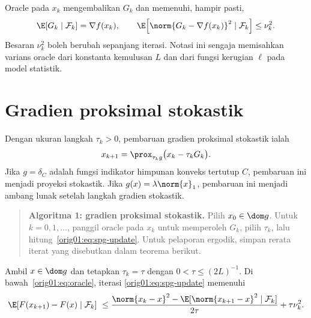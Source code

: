 Oracle pada $x_k$ mengembalikan $G_k$ dan memenuhi, hampir pasti,
\begin{equation}
  \label{orig01:eq:oracle}
  \E[G_k\mid\mathcal F_k]=\nabla f(x_k),
  \qquad
  \E\!\left[\norm{G_k-\nabla f(x_k)}^2\mid\mathcal F_k\right]
  \leq \nu_k^2.
\end{equation}
Besaran $\nu_k^2$ boleh berubah sepanjang iterasi. Notasi ini sengaja
memisahkan varians oracle dari konstanta kemulusan $L$ dan dari fungsi
kerugian $\ell$ pada model statistik.

\section{Gradien proksimal stokastik}
\label{orig01:section:spg}

Dengan ukuran langkah $\tau_k>0$, pembaruan gradien proksimal stokastik ialah
\begin{equation}
  \label{orig01:eq:spg-update}
  x_{k+1}
  =\prox_{\tau_k g}\bigl(x_k-\tau_kG_k\bigr).
\end{equation}
Jika $g=\delta_C$ adalah fungsi indikator himpunan konveks tertutup $C$,
pembaruan ini menjadi proyeksi stokastik. Jika $g(x)=\lambda\norm{x}_1$,
pembaruan ini menjadi ambang lunak setelah langkah gradien stokastik.

\begin{quote}
\textbf{Algoritma 1: gradien proksimal stokastik.}
Pilih $x_0\in\dom g$. Untuk $k=0,1,\dots$, panggil oracle pada $x_k$ untuk
memperoleh $G_k$, pilih $\tau_k$, lalu hitung~\eqref{orig01:eq:spg-update}.
Untuk pelaporan ergodik, simpan rerata iterat yang disebutkan dalam teorema
berikut.
\end{quote}

\begin{lemma}
  \label{orig01:lemma:spg-one-step}
  Ambil $x\in\dom g$ dan tetapkan $\tau_k=\tau$ dengan
  $0<\tau\leq(2L)^{-1}$. Di bawah~\eqref{orig01:eq:oracle}, iterasi
  \eqref{orig01:eq:spg-update} memenuhi
  \begin{multline}
    \label{orig01:eq:spg-one-step}
    \E[F(x_{k+1})-F(x)\mid\mathcal F_k]\
    \leq
    \frac{\norm{x_k-x}^2-
                \E[\norm{x_{k+1}-x}^2\mid\mathcal F_k]}{2\tau}
    +\tau\nu_k^2.
  \end{multline}
\end{lemma}

